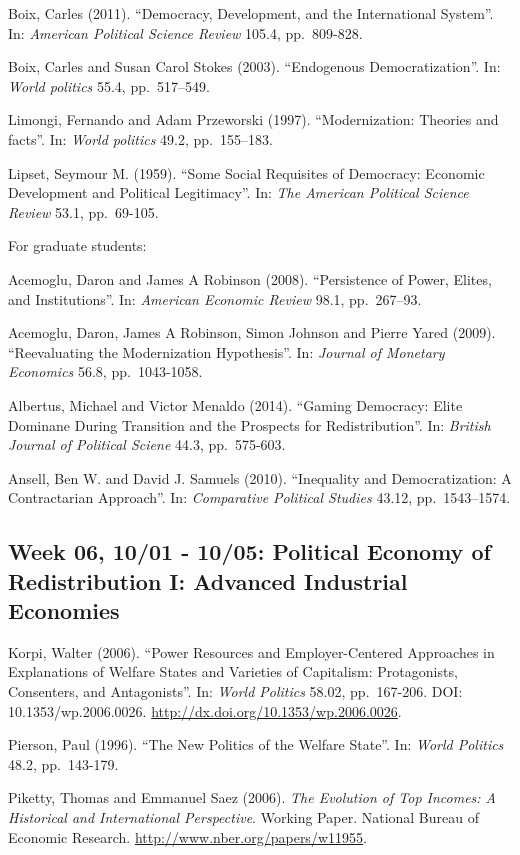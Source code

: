 \documentclass[11pt,]{article}
\begin{document}
Boix, Carles (2011). ``Democracy, Development, and the International
System''. In: \emph{American Political Science Review} 105.4,
pp.~809-828.

Boix, Carles and Susan Carol Stokes (2003). ``Endogenous
Democratization''. In: \emph{World politics} 55.4, pp.~517--549.

Limongi, Fernando and Adam Przeworski (1997). ``Modernization: Theories
and facts''. In: \emph{World politics} 49.2, pp.~155--183.

Lipset, Seymour M. (1959). ``Some Social Requisites of Democracy:
Economic Development and Political Legitimacy''. In:
\emph{The American Political Science Review} 53.1, pp.~69-105.

For graduate students:

Acemoglu, Daron and James A Robinson (2008). ``Persistence of Power,
Elites, and Institutions''. In: \emph{American Economic Review} 98.1,
pp.~267--93.

Acemoglu, Daron, James A Robinson, Simon Johnson and Pierre Yared
(2009). ``Reevaluating the Modernization Hypothesis''. In:
\emph{Journal of Monetary Economics} 56.8, pp.~1043-1058.

Albertus, Michael and Victor Menaldo (2014). ``Gaming Democracy: Elite
Dominane During Transition and the Prospects for Redistribution''. In:
\emph{British Journal of Political Sciene} 44.3, pp.~575-603.

Ansell, Ben W. and David J. Samuels (2010). ``Inequality and
Democratization: A Contractarian Approach''. In:
\emph{Comparative Political Studies} 43.12, pp.~1543--1574.

\subsection{Week 06, 10/01 - 10/05: Political Economy of Redistribution
I: Advanced Industrial
Economies}\label{week-06-1001---1005-political-economy-of-redistribution-i-advanced-industrial-economies}

Korpi, Walter (2006). ``Power Resources and Employer-Centered Approaches
in Explanations of Welfare States and Varieties of Capitalism:
Protagonists, Consenters, and Antagonists''. In: \emph{World Politics}
58.02, pp.~167-206. DOI: 10.1353/wp.2006.0026.
\url{http://dx.doi.org/10.1353/wp.2006.0026}.

Pierson, Paul (1996). ``The New Politics of the Welfare State''. In:
\emph{World Politics} 48.2, pp.~143-179.

Piketty, Thomas and Emmanuel Saez (2006).
\emph{The Evolution of Top Incomes: A Historical and International Perspective}.
Working Paper. National Bureau of Economic Research.
\url{http://www.nber.org/papers/w11955}.
\end{document}

